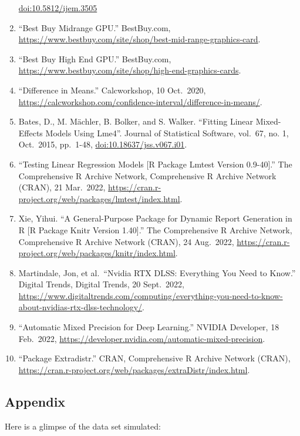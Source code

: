 \documentclass[
]{article}
\begin{document}
\begin{enumerate}
  \url{doi:10.5812/ijem.3505}
\item
  ``Best Buy Midrange GPU.'' BestBuy.com,
  \url{https://www.bestbuy.com/site/shop/best-mid-range-graphics-card}.
\item
  ``Best Buy High End GPU.'' BestBuy.com,
  \url{https://www.bestbuy.com/site/shop/high-end-graphics-cards}.
\item
  ``Difference in Means.'' Calcworkshop, 10 Oct.~2020,
  \url{https://calcworkshop.com/confidence-interval/difference-in-means/}.
\item
  Bates, D., M. Mächler, B. Bolker, and S. Walker. ``Fitting Linear
  Mixed-Effects Models Using Lme4''. Journal of Statistical Software,
  vol.~67, no. 1, Oct.~2015, pp.~1-48, \url{doi:10.18637/jss.v067.i01}.
\item
  ``Testing Linear Regression Models {[}R Package Lmtest Version
  0.9-40{]}.'' The Comprehensive R Archive Network, Comprehensive R
  Archive Network (CRAN), 21 Mar.~2022,
  \url{https://cran.r-project.org/web/packages/lmtest/index.html}.
\item
  Xie, Yihui. ``A General-Purpose Package for Dynamic Report Generation
  in R {[}R Package Knitr Version 1.40{]}.'' The Comprehensive R Archive
  Network, Comprehensive R Archive Network (CRAN), 24 Aug.~2022,
  \url{https://cran.r-project.org/web/packages/knitr/index.html}.
\item
  Martindale, Jon, et al.~``Nvidia RTX DLSS: Everything You Need to
  Know.'' Digital Trends, Digital Trends, 20 Sept.~2022,
  \url{https://www.digitaltrends.com/computing/everything-you-need-to-know-about-nvidias-rtx-dlss-technology/}.
\item
  ``Automatic Mixed Precision for Deep Learning.'' NVIDIA Developer, 18
  Feb.~2022,
  \url{https://developer.nvidia.com/automatic-mixed-precision}.
\item
  ``Package Extradistr.'' CRAN, Comprehensive R Archive Network (CRAN),
  \url{https://cran.r-project.org/web/packages/extraDistr/index.html}.
\end{enumerate}

\newpage

\hypertarget{appendix}{%
\subsection{Appendix}\label{appendix}}

Here is a glimpse of the data set simulated:
\end{document}
